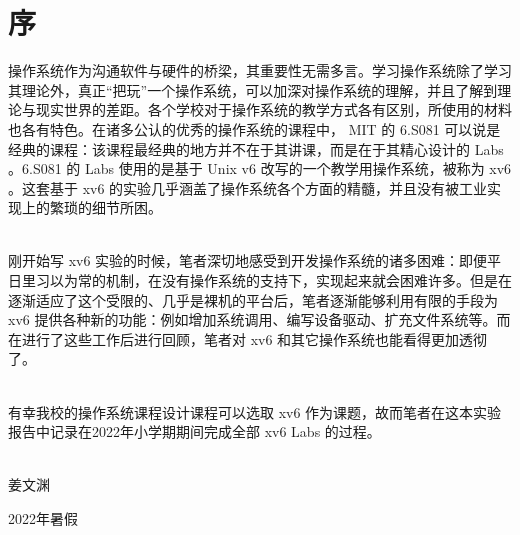 \chapter{序}

操作系统作为沟通软件与硬件的桥梁，其重要性无需多言。学习操作系统除了学习其理论外，真正“把玩”一个操作系统，可以加深对操作系统的理解，并且了解到理论与现实世界的差距。各个学校对于操作系统的教学方式各有区别，所使用的材料也各有特色。在诸多公认的优秀的操作系统的课程中， MIT 的 6.S081 可以说是经典的课程：该课程最经典的地方并不在于其讲课，而是在于其精心设计的 Labs 。6.S081 的 Labs 使用的是基于 Unix v6 改写的一个教学用操作系统，被称为 xv6 。这套基于 xv6 的实验几乎涵盖了操作系统各个方面的精髓，并且没有被工业实现上的繁琐的细节所困。

~\\

刚开始写 xv6 实验的时候，笔者深切地感受到开发操作系统的诸多困难：即便平日里习以为常的机制，在没有操作系统的支持下，实现起来就会困难许多。但是在逐渐适应了这个受限的、几乎是裸机的平台后，笔者逐渐能够利用有限的手段为 xv6 提供各种新的功能：例如增加系统调用、编写设备驱动、扩充文件系统等。而在进行了这些工作后进行回顾，笔者对 xv6 和其它操作系统也能看得更加透彻了。

~\\

有幸我校的操作系统课程设计课程可以选取 xv6 作为课题，故而笔者在这本实验报告中记录在2022年小学期期间完成全部 xv6 Labs 的过程。

~\\

姜文渊

2022年暑假
